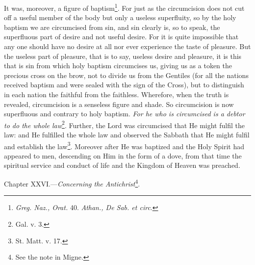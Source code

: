 It was, moreover, a figure of baptism\footnote{\emph{Greg. Naz., Orat. }40.\emph{ Athan., De Sab. et circ}.}. For just as the circumcision does not cut off a useful member of the body but only a useless superfluity, so by the holy baptism we are circumcised from sin, and sin clearly is, so to speak, the superfluous part of desire and not useful desire. For it is quite impossible that any one should have no desire at all nor ever experience the taste of pleasure. But the useless part of pleasure, that is to say, useless desire and pleasure, it is this that is sin from which holy baptism circumcises us, giving us as a token the precious cross on the brow, not to divide us from the Gentiles (for all the nations received baptism and were sealed with the sign of the Cross), but to distinguish in each nation the faithful from the faithless. Wherefore, when the truth is revealed, circumcision is a senseless figure and shade. So circumcision is now superfluous and contrary to holy baptism. \emph{For he who is circumcised is a debtor to do the whole law}\footnote{Gal. v. 3.}. Further, the Lord was circumcised that He might fulfil the law: and He fulfilled the whole law and observed the Sabbath that He might fulfil and establish the law\footnote{St. Matt. v. 17.}. Moreover after He was baptized and the Holy Spirit had appeared to men, descending on Him in the form of a dove, from that time the spiritual service and conduct of life and the Kingdom of Heaven was preached.


Chapter XXVI.—\emph{Concerning the Antichrist}\footnote{See the note in Migne.}.

